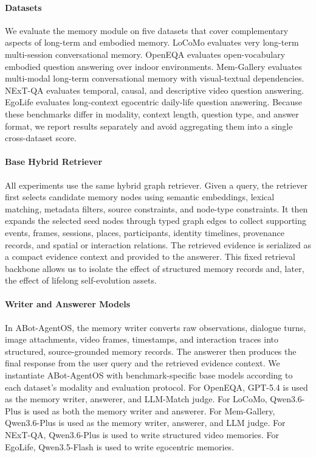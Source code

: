\paragraph{Datasets}
We evaluate the memory module on five datasets that cover complementary aspects of long-term and embodied memory.
LoCoMo evaluates very long-term multi-session conversational memory.
OpenEQA evaluates open-vocabulary embodied question answering over indoor environments.
Mem-Gallery evaluates multi-modal long-term conversational memory with visual-textual dependencies.
NExT-QA evaluates temporal, causal, and descriptive video question answering.
EgoLife evaluates long-context egocentric daily-life question answering.
Because these benchmarks differ in modality, context length, question type, and answer format, we report results separately and avoid aggregating them into a single cross-dataset score.

\paragraph{Base Hybrid Retriever}
All experiments use the same hybrid graph retriever.
Given a query, the retriever first selects candidate memory nodes using semantic embeddings, lexical matching, metadata filters, source constraints, and node-type constraints.
It then expands the selected seed nodes through typed graph edges to collect supporting events, frames, sessions, places, participants, identity timelines, provenance records, and spatial or interaction relations.
The retrieved evidence is serialized as a compact evidence context and provided to the answerer.
This fixed retrieval backbone allows us to isolate the effect of structured memory records and, later, the effect of lifelong self-evolution assets.

\paragraph{Writer and Answerer Models}
In ABot-AgentOS, the memory writer converts raw observations, dialogue turns, image attachments, video frames, timestamps, and interaction traces into structured, source-grounded memory records.
The answerer then produces the final response from the user query and the retrieved evidence context.
We instantiate ABot-AgentOS with benchmark-specific base models according to each dataset's modality and evaluation protocol.
For OpenEQA, GPT-5.4 is used as the memory writer, answerer, and LLM-Match judge.
For LoCoMo, Qwen3.6-Plus is used as both the memory writer and answerer.
For Mem-Gallery, Qwen3.6-Plus is used as the memory writer, answerer, and LLM judge.
For NExT-QA, Qwen3.6-Plus is used to write structured video memories.
For EgoLife, Qwen3.5-Flash is used to write egocentric memories.

